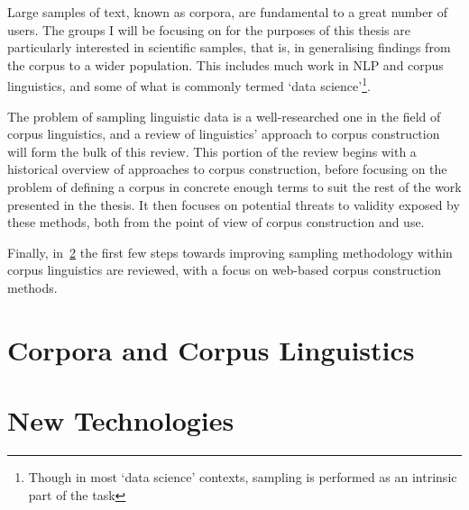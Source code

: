 Large samples of text, known as corpora, are fundamental to a great number of users.  The groups I will be focusing on for the purposes of this thesis are particularly interested in scientific samples, that is, in generalising findings from the corpus to a wider population.  This includes much work in NLP and corpus linguistics, and some of what is commonly termed `data science'\footnote{Though in most `data science' contexts, sampling is performed as an intrinsic part of the task}.


The problem of sampling linguistic data is a well-researched one in the field of corpus linguistics, and a review of linguistics' approach to corpus construction will form the bulk of this review.  This portion of the review begins with a historical overview of approaches to corpus construction, before focusing on the problem of defining a corpus in concrete enough terms to suit the rest of the work presented in the thesis.  It then focuses on potential threats to validity exposed by these methods, both from the point of view of corpus construction and use.


Finally, in~\ref{sec:litreview:newtech} the first few steps towards improving sampling methodology within corpus linguistics are reviewed, with a focus on web-based corpus construction methods.




\section{Corpora and Corpus Linguistics}
\label{sec:litreview:corpora}




%



\section{New Technologies} %
\label{sec:litreview:newtech}



